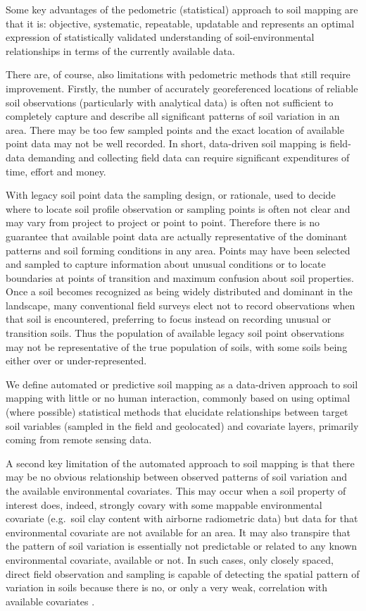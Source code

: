 \documentclass[11pt]{krantz}
\makeatletter
\newenvironment{kframe}{%
\medskip{}
\setlength{\fboxsep}{.8em}
 \def\at@end@of@kframe{}%
 \ifinner\ifhmode%
  \def\at@end@of@kframe{\end{minipage}}%
  \begin{minipage}{\columnwidth}%
 \fi\fi%
 \def\FrameCommand##1{\hskip\@totalleftmargin \hskip-\fboxsep
 \colorbox{shadecolor}{##1}\hskip-\fboxsep
     \hskip-\linewidth \hskip-\@totalleftmargin \hskip\columnwidth}%
 \MakeFramed {\advance\hsize-\width
   \@totalleftmargin\z@ \linewidth\hsize
   \@setminipage}}%
 {\par\unskip\endMakeFramed%
 \at@end@of@kframe}
\newenvironment{rmdblock}[1]
  {
  \begin{itemize}
  \renewcommand{\labelitemi}{
    \raisebox{-.7\height}[0pt][0pt]{
      {\setkeys{Gin}{width=3em,keepaspectratio}\texttt{[image: images/\#1]}}
    }
  }
  \setlength{\fboxsep}{1em}
  \begin{kframe}
  \item
  }
  {
  \end{kframe}
  \end{itemize}
  }
\newenvironment{rmdnote}
  {\begin{rmdblock}{note}}
  {\end{rmdblock}}
\theoremstyle{definition}
\theoremstyle{definition}
\theoremstyle{definition}
\theoremstyle{remark}
\makeatother
\begin{document}
Some key advantages of the pedometric (statistical) approach to soil
mapping are that it is: objective, systematic, repeatable, updatable and
represents an optimal expression of statistically validated
understanding of soil-environmental relationships in terms of the
currently available data.

There are, of course, also limitations with pedometric methods that
still require improvement. Firstly, the number of accurately
georeferenced locations of reliable soil observations (particularly with
analytical data) is often not sufficient to completely capture and
describe all significant patterns of soil variation in an area. There
may be too few sampled points and the exact location of available point
data may not be well recorded. In short, data-driven soil mapping is
field-data demanding and collecting field data can require significant
expenditures of time, effort and money.

With legacy soil point data the sampling design, or rationale, used to
decide where to locate soil profile observation or sampling points is
often not clear and may vary from project to project or point to point.
Therefore there is no guarantee that available point data are actually
representative of the dominant patterns and soil forming conditions in
any area. Points may have been selected and sampled to capture
information about unusual conditions or to locate boundaries at points
of transition and maximum confusion about soil properties. Once a soil
becomes recognized as being widely distributed and dominant in the
landscape, many conventional field surveys elect not to record
observations when that soil is encountered, preferring to focus instead
on recording unusual or transition soils. Thus the population of
available legacy soil point observations may not be representative of
the true population of soils, with some soils being either over or
under-represented.

\begin{rmdnote}
We define automated or predictive soil mapping as a data-driven approach
to soil mapping with little or no human interaction, commonly based on
using optimal (where possible) statistical methods that elucidate
relationships between target soil variables (sampled in the field and
geolocated) and covariate layers, primarily coming from remote sensing
data.
\end{rmdnote}

A second key limitation of the automated approach to soil mapping is
that there may be no obvious relationship between observed patterns of
soil variation and the available environmental covariates. This may
occur when a soil property of interest does, indeed, strongly covary
with some mappable environmental covariate (e.g.~soil clay content with
airborne radiometric data) but data for that environmental covariate are
not available for an area. It may also transpire that the pattern of
soil variation is essentially not predictable or related to any known
environmental covariate, available or not. In such cases, only closely
spaced, direct field observation and sampling is capable of detecting
the spatial pattern of variation in soils because there is no, or only a
very weak, correlation with available covariates
\citep{kondolf2003tools}.
\end{document}
